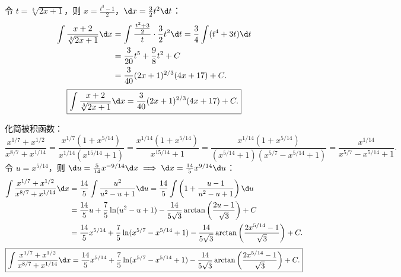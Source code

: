 \begin{solution}

    令 $t = \sqrt[3]{2x + 1}$，则 $x = \frac{t^3 - 1}{2}$，$\d x = \frac{3}{2}t^2 \d t$：
    \begin{equation}
        \begin{aligned}
            \int \frac{x + 2}{\sqrt[3]{2x + 1}} \d x & = \int \frac{\frac{t^3 + 3}{2}}{t} \cdot \frac{3}{2}t^2 \d t = \frac{3}{4}\int (t^4 + 3t) \d t \\
                                                     & = \frac{3}{20}t^5 + \frac{9}{8}t^2 + C                                                         \\
                                                     & = \frac{3}{40}(2x + 1)^{2/3}(4x + 17) + C.
        \end{aligned}
    \end{equation}
    \begin{equation}
        \boxed{\int \frac{x + 2}{\sqrt[3]{2x + 1}} \d x = \frac{3}{40}(2x + 1)^{2/3}(4x + 17) + C.}
    \end{equation}


    化简被积函数：
    \begin{equation}
        \frac{x^{1/7} + x^{1/2}}{x^{8/7} + x^{1/14}} = \frac{x^{1/7}(1 + x^{5/14})}{x^{1/14}(x^{15/14} + 1)} = \frac{x^{1/14}(1 + x^{5/14})}{x^{15/14} + 1} = \frac{x^{1/14}(1 + x^{5/14})}{(x^{5/14} + 1)(x^{5/7} - x^{5/14} + 1)} = \frac{x^{1/14}}{x^{5/7} - x^{5/14} + 1}.
    \end{equation}
    令 $u = x^{5/14}$，则 $\d u = \frac{5}{14}x^{-9/14}\d x \implies \d x = \frac{14}{5}x^{9/14}\d u$：
    \begin{equation}
        \begin{aligned}
            \int \frac{x^{1/7} + x^{1/2}}{x^{8/7} + x^{1/14}} \d x & = \frac{14}{5}\int \frac{u^2}{u^2 - u + 1} \d u = \frac{14}{5}\int \left( 1 + \frac{u - 1}{u^2 - u + 1} \right) \d u                            \\
                                                                   & = \frac{14}{5}u + \frac{7}{5}\ln(u^2 - u + 1) - \frac{14}{5\sqrt{3}}\arctan\left( \frac{2u - 1}{\sqrt{3}} \right) + C                           \\
                                                                   & = \frac{14}{5}x^{5/14} + \frac{7}{5}\ln(x^{5/7} - x^{5/14} + 1) - \frac{14}{5\sqrt{3}}\arctan\left( \frac{2x^{5/14} - 1}{\sqrt{3}} \right) + C.
        \end{aligned}
    \end{equation}
    \begin{equation}
        \boxed{\int \frac{x^{1/7} + x^{1/2}}{x^{8/7} + x^{1/14}} \d x = \frac{14}{5}x^{5/14} + \frac{7}{5}\ln(x^{5/7} - x^{5/14} + 1) - \frac{14}{5\sqrt{3}}\arctan\left( \frac{2x^{5/14} - 1}{\sqrt{3}} \right) + C.}
    \end{equation}


\end{solution}
